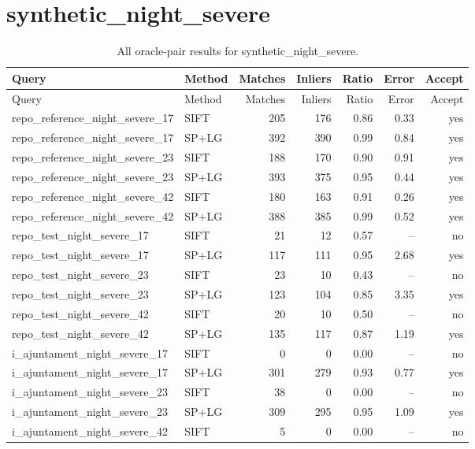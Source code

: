 \section{synthetic\_night\_severe}
\begingroup\scriptsize\setlength{\tabcolsep}{3pt}
\begin{longtable}{llrrrrr}
\caption{All oracle-pair results for synthetic\_night\_severe.}\\
\toprule
Query & Method & Matches & Inliers & Ratio & Error & Accept\\\midrule\endfirsthead
\toprule Query & Method & Matches & Inliers & Ratio & Error & Accept\\\midrule\endhead
\bottomrule\endfoot
repo\_reference\_night\_severe\_17 & SIFT & 205 & 176 & 0.86 & 0.33 & yes \\
repo\_reference\_night\_severe\_17 & SP+LG & 392 & 390 & 0.99 & 0.84 & yes \\
repo\_reference\_night\_severe\_23 & SIFT & 188 & 170 & 0.90 & 0.91 & yes \\
repo\_reference\_night\_severe\_23 & SP+LG & 393 & 375 & 0.95 & 0.44 & yes \\
repo\_reference\_night\_severe\_42 & SIFT & 180 & 163 & 0.91 & 0.26 & yes \\
repo\_reference\_night\_severe\_42 & SP+LG & 388 & 385 & 0.99 & 0.52 & yes \\
repo\_test\_night\_severe\_17 & SIFT & 21 & 12 & 0.57 & -- & no \\
repo\_test\_night\_severe\_17 & SP+LG & 117 & 111 & 0.95 & 2.68 & yes \\
repo\_test\_night\_severe\_23 & SIFT & 23 & 10 & 0.43 & -- & no \\
repo\_test\_night\_severe\_23 & SP+LG & 123 & 104 & 0.85 & 3.35 & yes \\
repo\_test\_night\_severe\_42 & SIFT & 20 & 10 & 0.50 & -- & no \\
repo\_test\_night\_severe\_42 & SP+LG & 135 & 117 & 0.87 & 1.19 & yes \\
i\_ajuntament\_night\_severe\_17 & SIFT & 0 & 0 & 0.00 & -- & no \\
i\_ajuntament\_night\_severe\_17 & SP+LG & 301 & 279 & 0.93 & 0.77 & yes \\
i\_ajuntament\_night\_severe\_23 & SIFT & 38 & 0 & 0.00 & -- & no \\
i\_ajuntament\_night\_severe\_23 & SP+LG & 309 & 295 & 0.95 & 1.09 & yes \\
i\_ajuntament\_night\_severe\_42 & SIFT & 5 & 0 & 0.00 & -- & no \\

\end{longtable}
